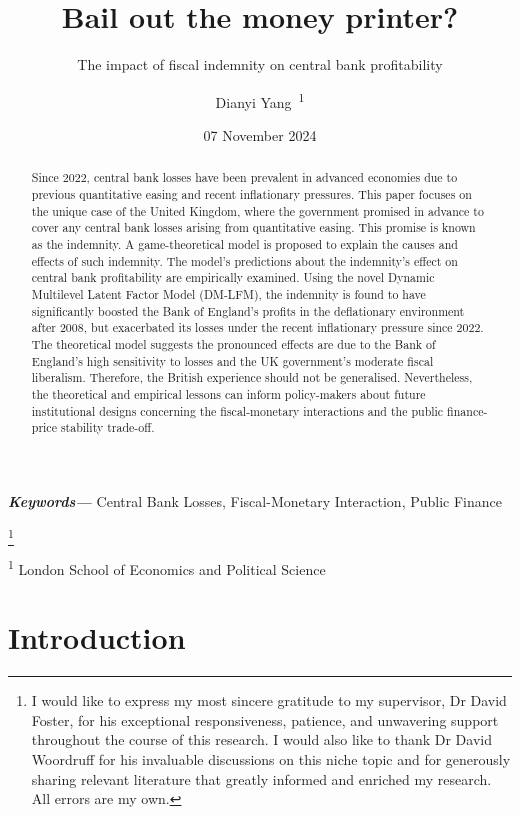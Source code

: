 \documentclass[
  a4paper,
  abstract=true]{scrartcl}
\title{Bail out the money printer?}
\subtitle{The impact of fiscal indemnity on central bank profitability}
\author{Dianyi Yang~\orcidlink{0009-0004-4652-3429}\textsuperscript{1}}
\date{07 November 2024}
\providecommand{\keywords}[1]
{
  \small	
  \textbf
{\textit{Keywords---}} #1
}
\newcommand\blfootnote[1]{%
  \begingroup

  \renewcommand\thefootnote{}\footnote{#1}%
  \addtocounter{footnote}{-1}%
  \endgroup }
\theoremstyle{definition}
\begin{document}
\maketitle
\begin{abstract}
Since 2022, central bank losses have been prevalent in advanced
economies due to previous quantitative easing and recent inflationary
pressures. This paper focuses on the unique case of the United Kingdom,
where the government promised in advance to cover any central bank
losses arising from quantitative easing. This promise is known as the
indemnity. A game-theoretical model is proposed to explain the causes
and effects of such indemnity. The model's predictions about the
indemnity's effect on central bank profitability are empirically
examined. Using the novel Dynamic Multilevel Latent Factor Model
(DM-LFM), the indemnity is found to have significantly boosted the Bank
of England's profits in the deflationary environment after 2008, but
exacerbated its losses under the recent inflationary pressure since
2022. The theoretical model suggests the pronounced effects are due to
the Bank of England's high sensitivity to losses and the UK government's
moderate fiscal liberalism. Therefore, the British experience should not
be generalised. Nevertheless, the theoretical and empirical lessons can
inform policy-makers about future institutional designs concerning the
fiscal-monetary interactions and the public finance-price stability
trade-off.
\end{abstract}
\begin{center}
\keywords{Central Bank Losses, Fiscal-Monetary Interaction, Public
Finance}
\end{center}

\blfootnote{I would like to express my most sincere gratitude to my
supervisor, Dr David Foster, for his exceptional responsiveness,
patience, and unwavering support throughout the course of this research.
I would also like to thank Dr David Woordruff for his invaluable
discussions on this niche topic and for generously sharing relevant
literature that greatly informed and enriched my research. All errors
are my own.}




\textsuperscript{1} London School of Economics and Political Science

\newpage

\section{Introduction}\label{introduction}
\end{document}
